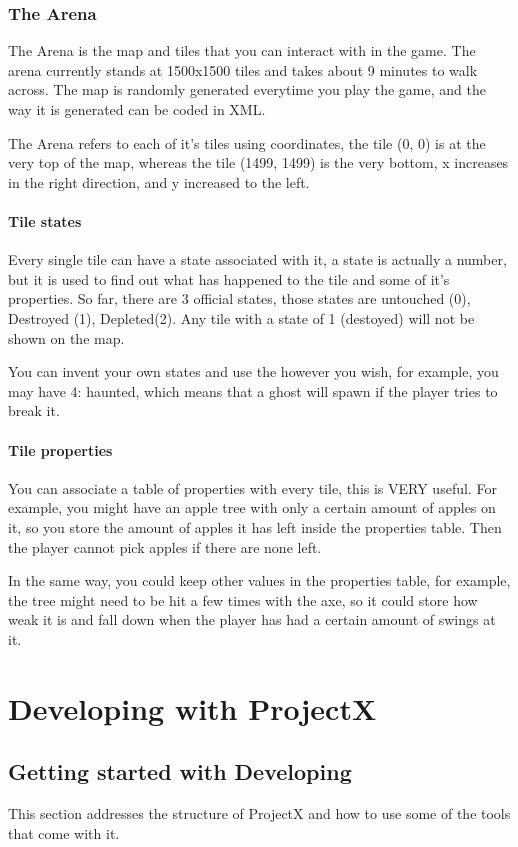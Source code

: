 \documentclass{book}
\begin{document}
	\section{The Arena}
	The Arena is the map and tiles that you can interact with in the game. The arena currently stands at 1500x1500 tiles and takes about 9 minutes to walk across. The map is randomly generated everytime you play the game, and the way it is generated can be coded in XML.

	The Arena refers to each of it's tiles using coordinates, the tile (0, 0) is at the very top of the map, whereas the tile (1499, 1499) is the very bottom, x increases in the right direction, and y increased to the left.

	\subsection{Tile states}
	Every single tile can have a state associated with it, a state is actually a number, but it is used to find out what has happened to the tile and some of it's properties. So far, there are 3 official states, those states are untouched (0), Destroyed (1), Depleted(2). Any tile with a state of 1 (destoyed) will not be shown on the map.
	
	You can invent your own states and use the however you wish, for example, you may have 4: haunted, which means that a ghost will spawn if the player tries to break it.

	\subsection{Tile properties}
	You can associate a table of properties with every tile, this is VERY useful. For example, you might have an apple tree with only a certain amount of apples on it, so you store the amount of apples it has left inside the properties table. Then the player cannot pick apples if there are none left. 
	
	In the same way, you could keep other values in the properties table, for example, the tree might need to be hit a few times with the axe, so it could store how weak it is and fall down when the player has had a certain amount of swings at it.

	\part{Developing with ProjectX}
	
	\chapter{Getting started with Developing}
	This section addresses the structure of ProjectX and how to use some of the tools that come with it.
	
\end{document}
